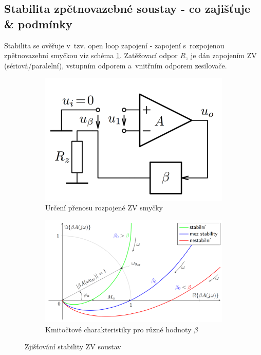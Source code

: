 \documentclass[a4paper,12pt]{article}   %
\begin{document}
\subsection*{Stabilita zpětnovazebné soustay - co zajišťuje \& podmínky}
Stabilita se ověřuje v~tzv. open loop zapojení - zapojení s~rozpojenou zpětnovazební smyčkou viz schéma \ref{sch:zv:open:loop}. Zatěžovací odpor $R_z$ je dán zapojením ZV (sériová/paralelní), vstupním odporem a~vnitřním odporem zesilovače.
\begin{figure}[h!]
    \centering
    \begin{subfigure}{.45\textwidth}
        \centering
        \includegraphics[width=\textwidth]{ZV-open_loop.PNG}
        \caption{Určení přenosu rozpojené ZV smyčky}
        \label{sch:zv:open:loop}
    \end{subfigure}
    \begin{subfigure}{.45\textwidth}
        \centering
        \includegraphics[width=\textwidth]{stabilita_vice.PNG}
        \caption{Kmitočtové charakteristiky pro různé hodnoty $\beta$}
        \label{graf:stabilita}
    \end{subfigure}
    \caption{Zjišťování stability ZV soustav}
\end{figure}
\end{document}
